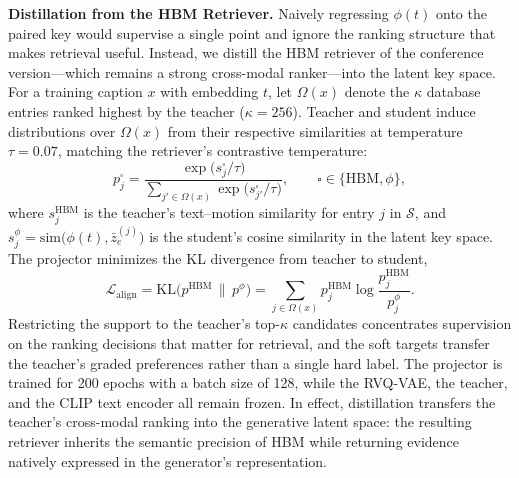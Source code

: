 \documentclass[10pt,journal,compsoc]{IEEEtran}
\newcommand{\myparagraph}[1]{\textbf{#1}\hspace{1.8ex}}
\begin{document}
\noindent \myparagraph{Distillation from the HBM Retriever.}
Naively regressing $\phi(t)$ onto the paired key would supervise a single point and ignore the ranking structure that makes retrieval useful. Instead, we distill the HBM retriever of the conference version---which remains a strong cross-modal ranker---into the latent key space.
For a training caption $x$ with embedding $t$, let $\Omega(x)$ denote the $\kappa$ database entries ranked highest by the teacher ($\kappa = 256$). Teacher and student induce distributions over $\Omega(x)$ from their respective similarities at temperature $\tau = 0.07$, matching the retriever's contrastive temperature:
\begin{equation}
p^{\square}_j
=
\frac{
    \exp\big( s^{\square}_j / \tau \big)
}{
    \sum_{j' \in \Omega(x)} \exp\big( s^{\square}_{j'} / \tau \big)
},
\qquad
\square \in \{ \mathrm{HBM}, \phi \},
\end{equation}
where $s^{\mathrm{HBM}}_j$ is the teacher's text--motion similarity for entry $j$ in $\mathcal{S}$, and $s^{\phi}_j = \mathrm{sim}\big( \phi(t), \bar{z}_e^{(j)} \big)$ is the student's cosine similarity in the latent key space. The projector minimizes the KL divergence from teacher to student,
\begin{equation}
\mathcal{L}_{\mathrm{align}}
=
\mathrm{KL}\big( p^{\mathrm{HBM}} \,\|\, p^{\phi} \big)
=
\sum_{j \in \Omega(x)}
p^{\mathrm{HBM}}_j
\log
\frac{p^{\mathrm{HBM}}_j}{p^{\phi}_j}.
\end{equation}
Restricting the support to the teacher's top-$\kappa$ candidates concentrates supervision on the ranking decisions that matter for retrieval, and the soft targets transfer the teacher's graded preferences rather than a single hard label. The projector is trained for 200 epochs with a batch size of 128, while the RVQ-VAE, the teacher, and the CLIP text encoder all remain frozen. In effect, distillation transfers the teacher's cross-modal ranking into the generative latent space: the resulting retriever inherits the semantic precision of HBM while returning evidence natively expressed in the generator's representation.
\end{document}
